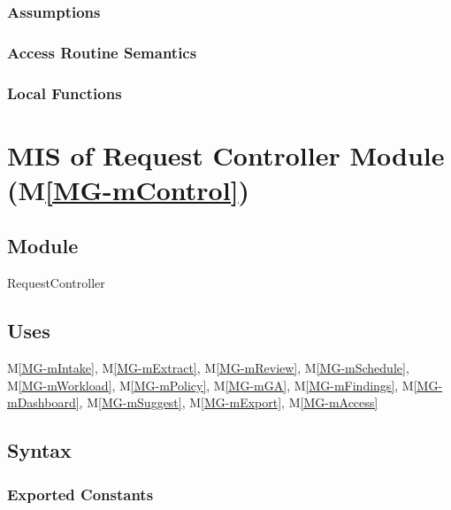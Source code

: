 \documentclass[12pt, titlepage]{article}
\newcommand{\mref}[1]{M\ref{MG-#1}}
\begin{document}

\subsubsection{Assumptions}


\subsubsection{Access Routine Semantics}


\subsubsection{Local Functions}


\newpage

\section{MIS of Request Controller Module (\mref{mControl})} \label{mis-mControl}

\subsection{Module}

RequestController

\subsection{Uses}

\mref{mIntake}, \mref{mExtract}, \mref{mReview}, \mref{mSchedule}, \mref{mWorkload}, \mref{mPolicy}, \mref{mGA}, \mref{mFindings}, \mref{mDashboard}, \mref{mSuggest}, \mref{mExport}, \mref{mAccess}

\subsection{Syntax}

\subsubsection{Exported Constants}
\end{document}
